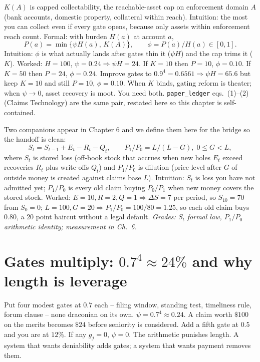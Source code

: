 $K(A)$ is capped collectability, the reachable-asset cap on enforcement domain $A$ (bank accounts, domestic property, collateral within reach). Intuition: the most you can collect even if every gate opens, because only assets within enforcement reach count. Formal: with burden $H(a)$ at account $a$,
\begin{equation}
P(a)=\min\{\psi H(a),\,K(A)\},\qquad \phi = P(a)/H(a)\in[0,1].
\label{eq:phi5}
\end{equation}
Intuition: $\phi$ is what actually lands after gates thin it ($\psi H$) and the cap trims it ($K$). Worked: $H=100$, $\psi=0.24\Rightarrow\psi H=24$. If $K=10$ then $P=10$, $\phi=0.10$. If $K=50$ then $P=24$, $\phi=0.24$. Improve gates to $0.9^4=0.6561\Rightarrow\psi H=65.6$ but keep $K=10$ and still $P=10$, $\phi=0.10$. When $K$ binds, gating reform is theater; when $\psi\to0$, asset recovery is moot. You need both. \texttt{paper\_ledger} eqs.~(1)--(2) (Claims Technology) are the same pair, restated here so this chapter is self-contained.

Two companions appear in Chapter 6 and we define them here for the bridge so the handoff is clean:
\begin{equation}
S_t = S_{t-1}+E_t-R_t-Q_t,\qquad P_1/P_0 = L/(L-G),\;0\le G<L,
\label{eq:StP5}
\end{equation}
where $S_t$ is stored loss (off-book stock that accrues when new holes $E_t$ exceed recoveries $R_t$ plus write-offs $Q_t$) and $P_1/P_0$ is dilution (price level after $G$ of outside money is created against claims base $L$). Intuition: $S_t$ is loss you have not admitted yet; $P_1/P_0$ is every old claim buying $P_0/P_1$ when new money covers the stored stock. Worked: $E=10,R=2,Q=1\Rightarrow\Delta S=7$ per period, so $S_{10}=70$ from $S_0=0$; $L=100,G=20\Rightarrow P_1/P_0=100/80=1.25$, so each old claim buys $0.80$, a $20$ point haircut without a legal default. \textit{Grades: $S_t$ formal law, $P_1/P_0$ arithmetic identity; measurement in Ch.~6.}

\section{Gates multiply: $0.7^4 \approx 24\%$ and why length is leverage}
\label{sec:gates}

Put four modest gates at $0.7$ each -- filing window, standing test, timeliness rule, forum clause -- none draconian on its own. $\psi=0.7^4\approx0.24$. A claim worth $\$100$ on the merits becomes $\$24$ before seniority is considered. Add a fifth gate at $0.5$ and you are at $12\%$. If any $g_j=0$, $\psi=0$. The arithmetic punishes length. A system that wants deniability adds gates; a system that wants payment removes them.

